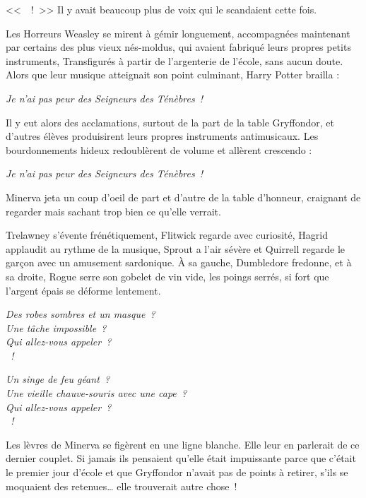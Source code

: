 {<<~~!~>> Il y avait beaucoup plus de voix qui le scandaient cette fois.

Les Horreurs Weasley se mirent à gémir longuement, accompagnées maintenant par certains des plus vieux nés-moldus, qui avaient fabriqué leurs propres petits instruments, Transfigurés à partir de l'argenterie de l'école, sans aucun doute. Alors que leur musique atteignait son point culminant, Harry Potter brailla :

\begin{center}
\emph{Je n'ai pas peur des Seigneurs des Ténèbres~!}
\end{center}

Il y eut alors des acclamations, surtout de la part de la table Gryffondor, et d'autres élèves produisirent leurs propres instruments antimusicaux. Les bourdonnements hideux redoublèrent de volume et allèrent crescendo :

\begin{center}
\emph{Je n'ai pas peur des Seigneurs des Ténèbres~!}
\end{center}

Minerva jeta un coup d'oeil de part et d'autre de la table d'honneur, craignant de regarder mais sachant trop bien ce qu'elle verrait.

Trelawney s'évente frénétiquement, Flitwick regarde avec curiosité, Hagrid applaudit au rythme de la musique, Sprout a l'air sévère et Quirrell regarde le garçon avec un amusement sardonique. À sa gauche, Dumbledore fredonne, et à sa droite, Rogue serre son gobelet de vin vide, les poings serrés, si fort que l'argent épais se déforme lentement.

\begin{center}
\emph{Des robes sombres et un masque~?\\
Une tâche impossible~?\\
Qui allez-vous appeler~?\\
~!}

\emph{Un singe de feu géant~?\\
Une vieille chauve-souris avec une cape~?\\
Qui allez-vous appeler~?\\
~!}
\end{center}

Les lèvres de Minerva se figèrent en une ligne blanche. Elle leur en parlerait de ce dernier couplet. Si jamais ils pensaient qu'elle était impuissante parce que c'était le premier jour d'école et que Gryffondor n'avait pas de points à retirer, s'ils se moquaient des retenues… elle trouverait autre chose~!

}
